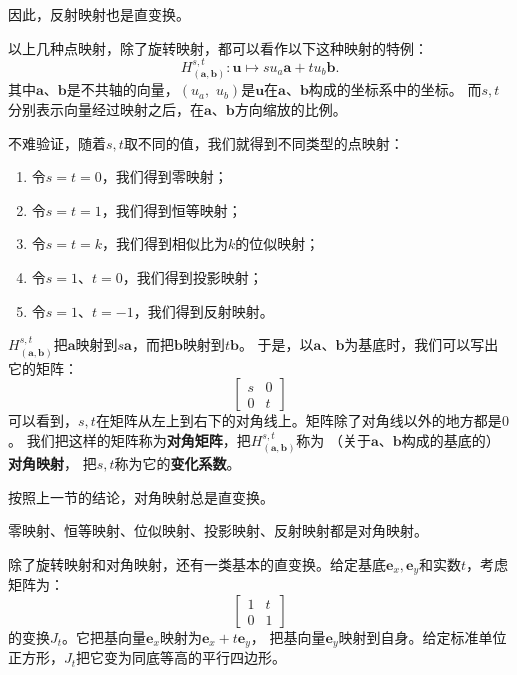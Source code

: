 \documentclass[12pt,UTF8]{ctexbook}
\begin{document}
因此，反射映射也是直变换。

以上几种点映射，除了旋转映射，都可以看作以下这种映射的特例：
$$ H_{(\mathbf{a},\mathbf{b})}^{s, t}: \mathbf{u} \mapsto su_a\mathbf{a} + tu_b\mathbf{b}.$$
其中$\mathbf{a}$、$\mathbf{b}$是不共轴的向量，$(u_a,\,\,u_b)$是$\mathbf{u}$在$\mathbf{a}$、$\mathbf{b}$构成的坐标系中的坐标。
而$s,t$分别表示向量经过映射之后，在$\mathbf{a}$、$\mathbf{b}$方向缩放的比例。

不难验证，随着$s,t$取不同的值，我们就得到不同类型的点映射：
\begin{enumerate}
    \item 令$s = t = 0$，我们得到零映射；
    \item 令$s = t = 1$，我们得到恒等映射；
    \item 令$s = t = k$，我们得到相似比为$k$的位似映射；
    \item 令$s = 1$、$t = 0$，我们得到投影映射；
    \item 令$s = 1$、$t = -1$，我们得到反射映射。
\end{enumerate}

$H_{(\mathbf{a},\mathbf{b})}^{s, t}$把$\mathbf{a}$映射到$s\mathbf{a}$，而把$\mathbf{b}$映射到$t\mathbf{b}$。
于是，以$\mathbf{a}$、$\mathbf{b}$为基底时，我们可以写出它的矩阵：
$$
\begin{bmatrix}
    s & 0 \\ 0 & t
\end{bmatrix}
$$
可以看到，$s,t$在矩阵从左上到右下的对角线上。矩阵除了对角线以外的地方都是$0$。
我们把这样的矩阵称为\textbf{对角矩阵}，把$H_{(\mathbf{a},\mathbf{b})}^{s, t}$称为
（关于$\mathbf{a}$、$\mathbf{b}$构成的基底的）\textbf{对角映射}，
把$s,t$称为它的\textbf{变化系数}。

按照上一节的结论，对角映射总是直变换。

零映射、恒等映射、位似映射、投影映射、反射映射都是对角映射。

除了旋转映射和对角映射，还有一类基本的直变换。给定基底$\mathbf{e}_x, \mathbf{e}_y$和实数$t$，考虑矩阵为：
$$
\begin{bmatrix}
    1 & t \\ 0 & 1
\end{bmatrix}
$$
的变换$J_t$。它把基向量$\mathbf{e}_x$映射为$\mathbf{e}_x + t\mathbf{e}_y$，
把基向量$\mathbf{e}_y$映射到自身。给定标准单位正方形，$J_t$把它变为同底等高的平行四边形。
\end{document}
